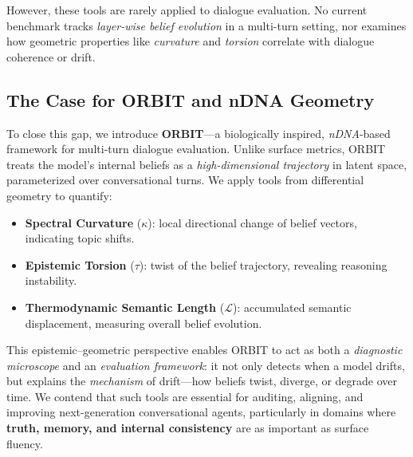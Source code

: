 \documentclass[11pt]{article}
\begin{document}
However, these tools are rarely applied to dialogue evaluation. No current benchmark tracks \emph{layer-wise belief evolution} in a multi-turn setting, nor examines how geometric properties like \emph{curvature} and \emph{torsion} correlate with dialogue coherence or drift.

\subsection{The Case for ORBIT and nDNA Geometry}

To close this gap, we introduce \textbf{ORBIT}—a biologically inspired, \emph{nDNA}-based framework for multi-turn dialogue evaluation. Unlike surface metrics, ORBIT treats the model’s internal beliefs as a \emph{high-dimensional trajectory} in latent space, parameterized over conversational turns. We apply tools from differential geometry to quantify:
\begin{itemize}
    \item \textbf{Spectral Curvature} ($\kappa$): local directional change of belief vectors, indicating topic shifts.
    \item \textbf{Epistemic Torsion} ($\tau$): twist of the belief trajectory, revealing reasoning instability.
    \item \textbf{Thermodynamic Semantic Length} ($\mathcal{L}$): accumulated semantic displacement, measuring overall belief evolution.
\end{itemize}

This epistemic–geometric perspective enables ORBIT to act as both a \emph{diagnostic microscope} and an \emph{evaluation framework}: it not only detects when a model drifts, but explains the \emph{mechanism} of drift—how beliefs twist, diverge, or degrade over time. We contend that such tools are essential for auditing, aligning, and improving next-generation conversational agents, particularly in domains where \textbf{truth, memory, and internal consistency} are as important as surface fluency.
\end{document}
